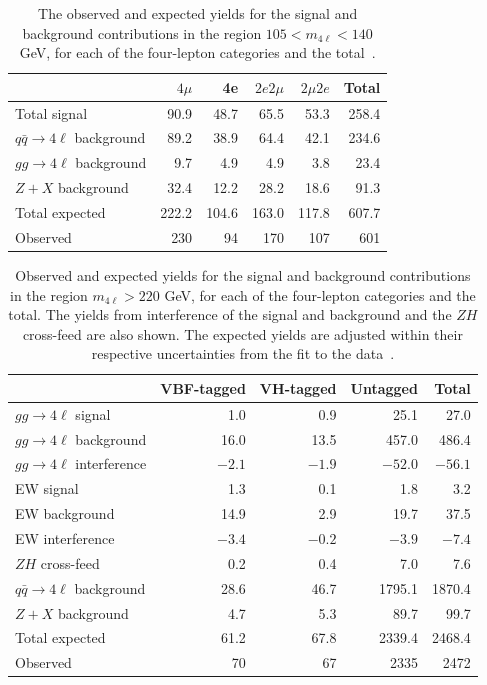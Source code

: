 \begin{table}[!htb] 
\centering
\begin{tabular}{lrrrrr}
   	&	$4\mu$	&	4e	&	$2e2\mu$	&	$2\mu2e$	& Total \\
\hline
Total signal    &       90.9    &       48.7    &       65.5    &       53.3    &       258.4   \\
$q\bar{q}\to4\ell$ background 	&	89.2	&	38.9	&	64.4	&	42.1	&	234.6	\\
$gg\to4\ell$ background	&	9.7	&	4.9	&	4.9	&	3.8	&	23.4	\\
$Z+X$ background	&	32.4	&	12.2	&	28.2	&	18.6	&	91.3	\\
Total expected	&	222.2	&	104.6	&	163.0	&	117.8	&	607.7	\\	
Observed	&	230	&	94	&	170	& 107	&	601	\\
\end{tabular}
\caption{The observed and expected yields for the \Hboson signal and background contributions in the \onshell region $105<m_{4\ell}<140$ GeV, for each of the four-lepton categories and the total~\cite{PhysRevD.111.092014}.}
\label{table:yields_SR}
\end{table}

\begin{table}[!htb] 
\centering
\begin{tabular}{lrrrr}
& VBF-tagged & VH-tagged & Untagged & Total \\
\hline
$gg\to4\ell$ signal &1.0 & 0.9 & 25.1 & 27.0 \\
$gg\to4\ell$ background & 16.0 & 13.5 & 457.0& 486.4 \\
$gg\to4\ell$ interference & $-2.1$ & $-1.9$  &  $-52.0$ & $-56.1$ \\
EW signal         & 1.3 & 0.1 & 1.8& 3.2\\
EW background     & 14.9 & 2.9 & 19.7& 37.5\\
EW interference     & $-3.4$ & $-0.2$ & $-3.9$ & $-7.4$ \\
$ZH$ cross-feed & 0.2 & 0.4 & 7.0& 7.6 \\
$q\bar{q}\to4\ell$ background & 28.6 & 46.7 & 1795.1 & 1870.4  \\
$Z+X$ background & 4.7 & 5.3 & 89.7& 99.7  \\
Total expected & 61.2 & 67.8 & 2339.4 & 2468.4\\
Observed & 70 & 67 & 2335 & 2472 \\
\end{tabular}
\caption{Observed and expected yields for the \Hboson signal and background contributions 
in the \offshell region $m_{4\ell}> 220$ GeV, for each of the four-lepton categories and the total. 
The yields from interference of the signal and background and the $ZH$ cross-feed are also shown. 
The expected yields are adjusted within their respective uncertainties from the fit to the data~\cite{PhysRevD.111.092014}.}
\label{tab:templateyields_offshell}
\end{table}

